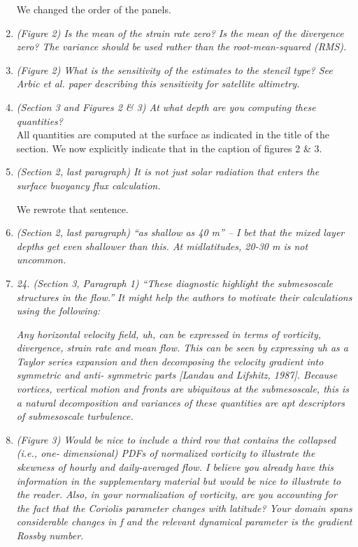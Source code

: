 \documentclass[11pt]{article}
\newcommand{\bdp}{\begin{description}}
\newcommand{\edp}{\end{description}}
\begin{document}
\begin{enumerate}
        \bdp
          We changed the order of the panels.
        \edp

\item {\it (Figure 2) Is the mean of the strain rate zero? Is the mean of the divergence zero? The
        variance should be used rather than the root-mean-squared (RMS).}

\item {\it (Figure 2) What is the sensitivity of the estimates to the stencil type? See Arbic et al.
        paper describing this sensitivity for satellite altimetry.}

\item {\it (Section 3 and Figures 2 \& 3) At what depth are you computing these quantities?}\\

  All quantities are computed at the surface as indicated in the title of the
  section. We now explicitly indicate that in the caption of figures 2 \& 3.

\item {\it (Section 2, last paragraph) It is not just solar radiation that enters the surface buoyancy
      flux calculation.}

      We rewrote that sentence.

\item {\it (Section 2, last paragraph) ``as shallow as 40 m'' – I bet that the mixed layer depths get
      even shallower than this. At midlatitudes, 20-30 m is not uncommon.}

\item {\it 24. (Section 3, Paragraph 1) ``These diagnostic highlight the submesoscale structures in
      the flow.'' It might help the authors to motivate their calculations using the following:}\\

\begin{description}
      {\it Any horizontal velocity field, uh, can be expressed in terms of vorticity, divergence,
      strain rate and mean flow. This can be seen by expressing uh as a Taylor series
      expansion and then decomposing the velocity gradient into symmetric and anti-
      symmetric parts [Landau and Lifshitz, 1987]. Because vortices, vertical motion and
      fronts are ubiquitous at the submesoscale, this is a natural decomposition and
      variances of these quantities are apt descriptors of submesoscale turbulence.}
\end{description}

\item {\it (Figure 3) Would be nice to include a third row that contains the collapsed (i.e., one-
      dimensional) PDFs of normalized vorticity to illustrate the skewness of hourly and
      daily-averaged flow. I believe you already have this information in the supplementary
      material but would be nice to illustrate to the reader. Also, in your normalization of
      vorticity, are you accounting for the fact that the Coriolis parameter changes with
      latitude? Your domain spans considerable changes in f and the relevant dynamical
      parameter is the gradient Rossby number.}


\end{enumerate}
\end{document}
